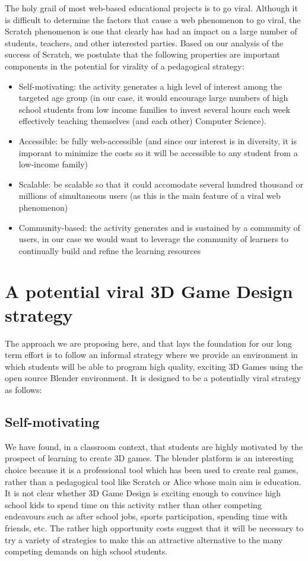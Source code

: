 \documentclass{sig-alternate}
\begin{document}
The holy grail of most web-based educational projects is to go viral. Although it is difficult to
determine the factors that cause a web phenomenon to go viral, the Scratch phenomenon is one that
clearly has had an impact on a large number of students, teachers, and other interested parties.
Based on our analysis of the success of Scratch, we postulate that the following
properties are important components in the potential for virality of a pedagogical strategy:
\begin{itemize}
\item Self-motivating: the activity generates a high level of interest among the targeted age group
(in our case, it would 
encourage large numbers of high school students from low income families to invest
several hours each week effectively teaching themselves (and each other) Computer Science).
\item Accessible: be fully web-accessible (and since our interest is in diversity, it is imporant to
minimize the costs so it will be accessible to any student from a low-income family)
\item Scalable: be scalable so that it could accomodate several hundred thousand or millions of 
simultaneous users (as this is the main feature of a viral web phenomenon)
\item Community-based: the activity generates and is sustained by a community of users, in our case we would want to leverage the community of learners to continually build and refine the learning resources
\end{itemize}

\section{A potential viral 3D Game Design strategy}
The approach we are proposing here, and that lays the foundation for our long term effort is to follow an informal strategy where we provide an environment in which students
will be able to program high quality, exciting 3D Games using the open source Blender environment. It is designed to be a potentially viral strategy as follows:

\subsection{ Self-motivating} We have found, in a classroom context, that students are highly motivated by the prospect of learning to create 3D games. The blender platform is an interesting choice because it is a professional tool which has been used to create real games, rather than a pedagogical tool like Scratch or Alice whose main aim is education. It is not clear whether 3D Game Design is exciting enough to convince high school kids to spend time on this activity rather than other competing endeavours such as after school jobs, sports participation, spending time with friends, etc. The rather high opportunity costs suggest that it will be necessary to try a variety of strategies to make this an attractive alternative to the many competing demands on high school students.
\end{document}
